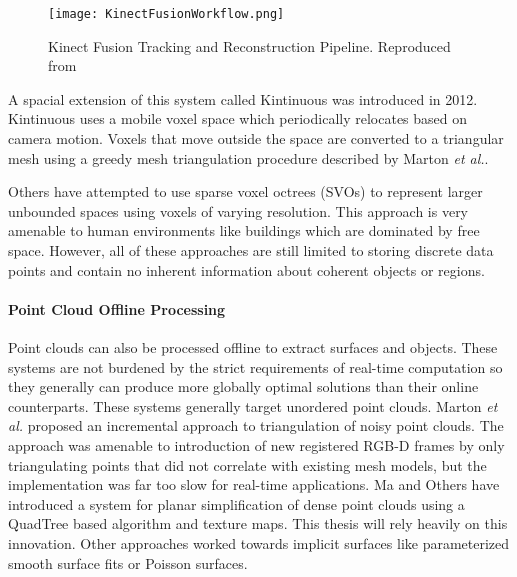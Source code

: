 \begin{figure}[!htpb]
    \centering
    \texttt{[image: KinectFusionWorkflow.png]}
    \caption{Kinect Fusion Tracking and Reconstruction Pipeline. Reproduced from\cite{izadi2011kinectfusion}}
    \label{fig:kinfu_workflow}
\end{figure}

A spacial extension of this system called Kintinuous was introduced in 2012\cite{whelan2012kintinuous,whelan:odometry}. Kintinuous uses a mobile voxel space which periodically relocates based on camera motion. Voxels that move outside the space are converted to a triangular mesh using a greedy mesh triangulation procedure described by Marton \textit{et al.}\cite{marton:fastreconstruction}.\par
Others have attempted to use sparse voxel octrees (SVOs) to represent larger unbounded spaces using voxels of varying resolution\cite{laine:svo,fastvoxelmaps}. This approach is very amenable to human environments like buildings which are dominated by free space. However, all of these approaches are still limited to storing discrete data points and contain no inherent information about coherent objects or regions.
\paragraph{Point Cloud Offline Processing}
Point clouds can also be processed offline to extract surfaces and objects. These systems are not burdened by the strict requirements of real-time computation so they generally can produce more globally optimal solutions than their online counterparts. These systems generally target unordered point clouds. Marton \textit{et al.} proposed an incremental approach to triangulation of noisy point clouds\cite{marton:fastreconstruction}. The approach was amenable to introduction of new registered RGB-D frames by only triangulating points that did not correlate with existing mesh models, but the implementation was far too slow for real-time applications. Ma and Others have introduced a system for planar simplification of dense point clouds using a QuadTree based algorithm\cite{ma2013planar,planesegmentationQTB} and texture maps. This thesis will rely heavily on this innovation. Other approaches worked towards implicit surfaces like parameterized smooth surface fits \cite{hormann2003scattered} or Poisson surfaces\cite{kazhdan2006poisson,bolitho2009parallel}.
